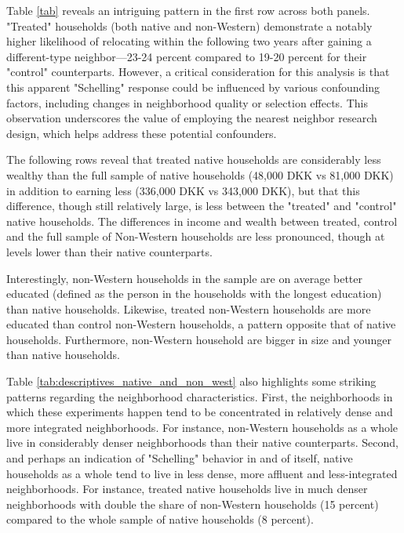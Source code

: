 \documentclass[main.tex]{subfiles}
\begin{document}
Table \ref{tab} reveals an intriguing pattern in the first row across both panels. "Treated" households (both native and non-Western) demonstrate a notably higher likelihood of relocating within the following two years after gaining a different-type neighbor—23-24 percent compared to 19-20 percent for their "control" counterparts. However, a critical consideration for this analysis is that this apparent "Schelling" response could be influenced by various confounding factors, including changes in neighborhood quality or selection effects. This observation underscores the value of employing the nearest neighbor research design, which helps address these potential confounders.

The following rows reveal that treated native households are considerably less wealthy than the full sample of native households (48,000 DKK vs 81,000 DKK) in addition to earning less (336,000 DKK vs 343,000 DKK), but that this difference, though still relatively large, is less between the "treated" and "control" native households. The differences in income and wealth between treated, control and the full sample of Non-Western households are less pronounced, though at levels lower than their native counterparts.

Interestingly, non-Western households in the sample are on average better educated (defined as the person in the households with the longest education) than native households. Likewise, treated non-Western households are more educated than control non-Western households, a pattern opposite that of native households. Furthermore, non-Western household are bigger in size and younger than native households. 

Table \ref{tab:descriptives_native_and_non_west} also highlights some striking patterns regarding the neighborhood characteristics. First, the neighborhoods in which these experiments happen tend to be concentrated in relatively dense and more integrated neighborhoods. For instance, non-Western households as a whole live in considerably denser neighborhoods than their native counterparts. Second, and perhaps an indication of "Schelling" behavior in and of itself, native households as a whole tend to live in less dense, more affluent and less-integrated neighborhoods. For instance, treated native households live in much denser neighborhoods with double the share of non-Western households (15 percent) compared to the whole sample of native households (8 percent). 
\end{document}

